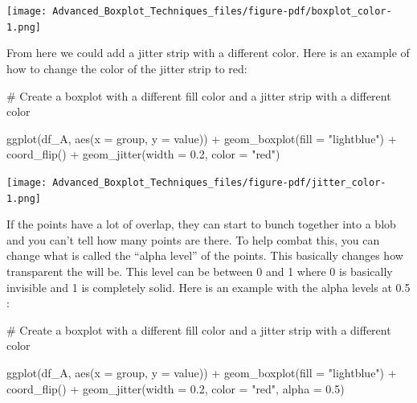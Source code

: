 \documentclass[
  letterpaper,
  DIV=11,
  numbers=noendperiod]{scrreprt}
\newenvironment{Shaded}{\begin{snugshade}}{\end{snugshade}}
\newcommand{\AttributeTok}[1]{\textcolor[rgb]{0.40,0.45,0.13}{#1}}
\newcommand{\CommentTok}[1]{\textcolor[rgb]{0.37,0.37,0.37}{#1}}
\newcommand{\FloatTok}[1]{\textcolor[rgb]{0.68,0.00,0.00}{#1}}
\newcommand{\FunctionTok}[1]{\textcolor[rgb]{0.28,0.35,0.67}{#1}}
\newcommand{\NormalTok}[1]{\textcolor[rgb]{0.00,0.23,0.31}{#1}}
\newcommand{\SpecialCharTok}[1]{\textcolor[rgb]{0.37,0.37,0.37}{#1}}
\newcommand{\StringTok}[1]{\textcolor[rgb]{0.13,0.47,0.30}{#1}}
\begin{document}
\begin{center}
\texttt{[image: Advanced\_Boxplot\_Techniques\_files/figure-pdf/boxplot\_color-1.png]}
\end{center}

From here we could add a jitter strip with a different color. Here is an
example of how to change the color of the jitter strip to red:

\begin{Shaded}
\begin{Highlighting}[]
\CommentTok{\# Create a boxplot with a different fill color and a jitter strip with a different color}

\FunctionTok{ggplot}\NormalTok{(df\_A, }\FunctionTok{aes}\NormalTok{(}\AttributeTok{x =}\NormalTok{ group, }\AttributeTok{y =}\NormalTok{ value)) }\SpecialCharTok{+}
  \FunctionTok{geom\_boxplot}\NormalTok{(}\AttributeTok{fill =} \StringTok{"lightblue"}\NormalTok{) }\SpecialCharTok{+}
  \FunctionTok{coord\_flip}\NormalTok{() }\SpecialCharTok{+}
  \FunctionTok{geom\_jitter}\NormalTok{(}\AttributeTok{width =} \FloatTok{0.2}\NormalTok{, }\AttributeTok{color =} \StringTok{"red"}\NormalTok{)}
\end{Highlighting}
\end{Shaded}

\begin{center}
\texttt{[image: Advanced\_Boxplot\_Techniques\_files/figure-pdf/jitter\_color-1.png]}
\end{center}

If the points have a lot of overlap, they can start to bunch together
into a blob and you can't tell how many points are there. To help combat
this, you can change what is called the ``alpha level'' of the points.
This basically changes how transparent the will be. This level can be
between 0 and 1 where 0 is basically invisible and 1 is completely
solid. Here is an example with the alpha levels at 0.5 :

\begin{Shaded}
\begin{Highlighting}[]
\CommentTok{\# Create a boxplot with a different fill color and a jitter strip with a different color}

\FunctionTok{ggplot}\NormalTok{(df\_A, }\FunctionTok{aes}\NormalTok{(}\AttributeTok{x =}\NormalTok{ group, }\AttributeTok{y =}\NormalTok{ value)) }\SpecialCharTok{+}
  \FunctionTok{geom\_boxplot}\NormalTok{(}\AttributeTok{fill =} \StringTok{"lightblue"}\NormalTok{) }\SpecialCharTok{+}
  \FunctionTok{coord\_flip}\NormalTok{() }\SpecialCharTok{+}
  \FunctionTok{geom\_jitter}\NormalTok{(}\AttributeTok{width =} \FloatTok{0.2}\NormalTok{, }\AttributeTok{color =} \StringTok{"red"}\NormalTok{, }\AttributeTok{alpha =} \FloatTok{0.5}\NormalTok{)}
\end{Highlighting}
\end{Shaded}
\end{document}
